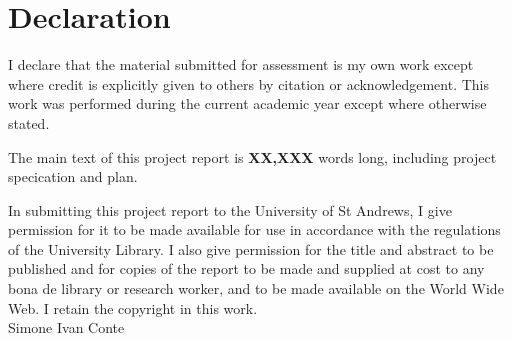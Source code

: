 \section{Declaration}
I declare that the material submitted for assessment is my own work except where credit is explicitly
given to others by citation or acknowledgement. This work was performed during the current academic
year except where otherwise stated.

The main text of this project report is \textbf{XX,XXX} words long, including project specication and plan.

In submitting this project report to the University of St Andrews, I give permission for it to be made
available for use in accordance with the regulations of the University Library. I also give permission for
the title and abstract to be published and for copies of the report to be made and supplied at cost to
any bona de library or research worker, and to be made available on the World Wide Web. I retain the
copyright in this work.
\\[2in]
Simone Ivan Conte
\newpage